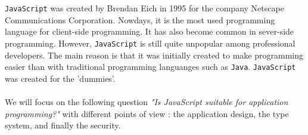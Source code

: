 \texttt{JavaScript} was created by Brendan Eich in 1995 for the company Netscape Communications Corporation. Nowdays, it is the most used programming language for client-side programming. It has also become common in sever-side programming. However, \texttt{JavaScript} is still quite unpopular among professional developers. The main reason is that it was initially created to make programming easier than with traditional programming languanges such as \texttt{Java}. \texttt{JavaScript} was created for the 'dummies'.
\paragraph{}
We will focus on the following question \emph{"Is JavaScript suitable for application programming?"} with different points of view : the application design, the type system, and finally the security. 
